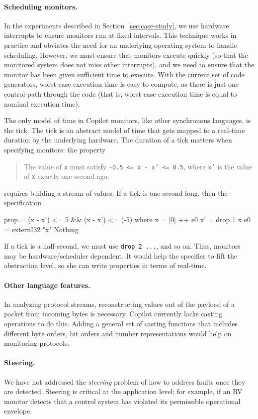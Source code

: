 \paragraph{Scheduling monitors.}
In the experiments described in Section~\ref{sec:case-study}, we use hardware
interrupts to ensure monitors run at fixed intervals.  This technique works in
practice and obviates the need for an underlying operating system to handle
scheduling.  However, we must ensure that monitors execute quickly (so that the
monitored system does not miss other interrupts), and we need to ensure that the
monitor has been given sufficient time to execute.  With the current set of code
generators, worst-case execution time is easy to compute, as there is just one
control-path through the code (that is, worst-case execution time is equal to
nominal execution time).  

The only model of time in Copilot monitors, like other synchronous languages, is
the tick.  The tick is an abstract model of time that gets mapped to a real-time
duration by the underlying hardware.  The duration of a tick matters when
specifying monitors: the property
%
\begin{quote}
The value of {\tt x} must satisfy {\tt -0.5
  <= x - x' <= 0.5}, where {\tt x'} is the value of {\tt x} exactly one second ago.
\end{quote}
%
\noindent
requires building a stream of values.  If a tick is one second long, then the
specification
%
\begin{code}
prop = (x - x') <= 5 && (x - x') <= (-5)
  where
  x  = [0] ++ e0 
  x' = drop 1 x
  e0 = externI32 "x" Nothing
\end{code}
%
\noindent
If a tick is a half-second, we must use {\tt drop 2 ...}, and so on.  Thus,
monitors may be hardware/scheduler dependent.  It would help the specifier to
lift the abstraction level, so she can write properties in terms of real-time.

\paragraph{Other language features.}
In analyzing protocol streams, reconstructing values out of the payload of
a packet from incoming bytes is necessary. Copilot currently lacks casting
operations to do this. Adding a general set of casting functions that includes
different byte orders, bit orders and number representations would help on
monitoring protocols.

\paragraph{Steering.}
We have not addressed the \emph{steering} problem of how to address faults once
they are detected.  Steering is critical at the application level; for example,
if an RV monitor detects that a control system has violated its permissible
operational envelope.

